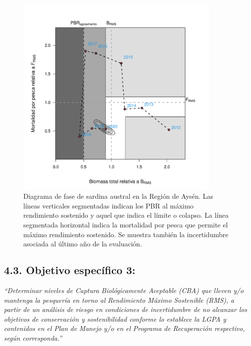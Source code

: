 \documentclass[
  spanish,
]{article}
\begin{document}
\pagebreak

\begin{figure}[h!]
\centering
\includegraphics[width=0.9\textwidth]{Figuras/Fig4_Zhou2013_fase-1.pdf}
\caption{Diagrama de fase de sardina austral en la Región de Aysén. Las líneas verticales segmentadas indican los PBR al máximo rendimiento sostenido y aquel que indica el límite o colapso. La línea segmentada horizontal indica la mortalidad por pesca que permite el máximo rendimiento sostenido. Se muestra también la incertidumbre asociada al último año de la evaluación.}
\label{Fig15}
\end{figure}

\pagebreak

\hypertarget{objetivo-especuxedfico-3-1}{%
\subsection{4.3. Objetivo específico
3:}\label{objetivo-especuxedfico-3-1}}

\vspace{-0.2cm}

\emph{``Determinar niveles de Captura Biológicamente Aceptable (CBA) que
lleven y/o mantenga la pesquería en torno al Rendimiento Máximo
Sostenible (RMS), a partir de un análisis de riesgo en condiciones de
incertidumbre de no alcanzar los objetivos de conservación y
sostenibilidad conforme lo establece la LGPA y contenidos en el Plan de
Manejo y/o en el Programa de Recuperación respectivo, según
corresponda.''} \vspace{0.5cm}
\end{document}
